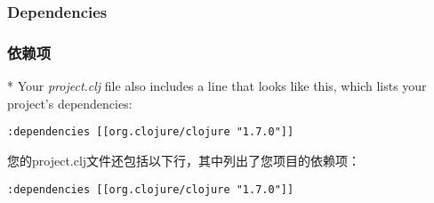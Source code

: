 \documentclass{book}
\begin{document}
\begin{paracol}{2}
\subsubsection{Dependencies}
\switchcolumn
\subsubsection{依赖项}
\switchcolumn[0]*
Your \emph{project.clj} file also includes a line that looks like this,
which lists your project's dependencies:
\begin{verbatim}
:dependencies [[org.clojure/clojure "1.7.0"]]
\end{verbatim}
\switchcolumn
您的project.clj文件还包括以下行，其中列出了您项目的依赖项：
\begin{verbatim}
:dependencies [[org.clojure/clojure "1.7.0"]]
\end{verbatim}

\end{paracol}
\end{document}
